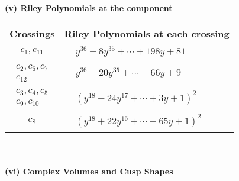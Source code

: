 \documentclass[1p]{elsarticle_modified}
\theoremstyle{definition}
\begin{document}
\newpage\renewcommand{\arraystretch}{1}
\flushleft \textbf{(v) Riley Polynomials at the component}\newline \\
\begin{tabular}{m{50pt}|m{274pt}}
Crossings & \hspace{64pt}Riley Polynomials at each crossing \\
\hline $$\begin{aligned}c_{1},c_{11}\end{aligned}$$&$\begin{aligned}
&y^{36}-8 y^{35}+\cdots+198 y+81
\end{aligned}$\\
\hline $$\begin{aligned}c_{2},c_{6},c_{7}\\c_{12}\end{aligned}$$&$\begin{aligned}
&y^{36}-20 y^{35}+\cdots-66 y+9
\end{aligned}$\\
\hline $$\begin{aligned}c_{3},c_{4},c_{5}\\c_{9},c_{10}\end{aligned}$$&$\begin{aligned}
&(y^{18}-24 y^{17}+\cdots+3 y+1)^{2}
\end{aligned}$\\
\hline $$\begin{aligned}c_{8}\end{aligned}$$&$\begin{aligned}
&(y^{18}+22 y^{16}+\cdots-65 y+1)^{2}
\end{aligned}$\\
\hline
\end{tabular}\\~\\
\newpage\flushleft \textbf{(vi) Complex Volumes and Cusp Shapes}
\end{document}
